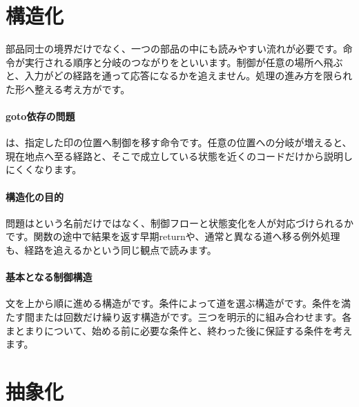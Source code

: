 \section{構造化}
\label{sec:04-software-engineering-06}

部品同士の境界だけでなく、一つの部品の中にも読みやすい流れが必要です。命令が実行される順序と分岐のつながりをといいます。制御が任意の場所へ飛ぶと、入力がどの経路を通って応答になるかを追えません。処理の進み方を限られた形へ整える考え方がです。

\begingroup
\begingroup
\paragraph{goto依存の問題}
        は、指定した印の位置へ制御を移す命令です。任意の位置への分岐が増えると、現在地点へ至る経路と、そこで成立している状態を近くのコードだけから説明しにくくなります。

\paragraph{構造化の目的}
        問題はという名前だけではなく、制御フローと状態変化を人が対応づけられるかです。関数の途中で結果を返す早期returnや、通常と異なる道へ移る例外処理も、経路を追えるかという同じ観点で読みます。

\par
\endgroup
\medskip
\begingroup
      \centering
      \vspace{5mm}
\paragraph{基本となる制御構造}
        文を上から順に進める構造がです。条件によって道を選ぶ構造がです。条件を満たす間または回数だけ繰り返す構造がです。三つを明示的に組み合わせます。各まとまりについて、始める前に必要な条件と、終わった後に保証する条件を考えます。

\par
\endgroup
\par
\endgroup


\section{抽象化}
\label{sec:04-software-engineering-07}

